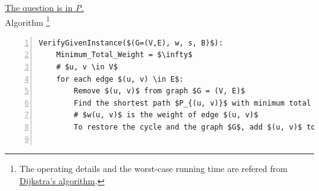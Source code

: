 \documentclass[10pt]{article}
\begin{document}
\begin{itemize}
\begin{mdframed}
        \underline{The question is in \textit{P.}}\\
        Algorithm \footnote {The operating details and the worst-case running time are refered from \href{https://en.wikipedia.org/wiki/Dijkstra\%27s_algorithm}{Dijkstra's algorithm}.}
        \begin{lstlisting}[mathescape=true, numbers=left]
VerifyGivenInstance($(G=(V,E), w, s, B)$):
    Minimum_Total_Weight = $\infty$
    # $u, v \in V$
    for each edge $(u, v) \in E$:
        Remove $(u, v)$ from graph $G = (V, E)$
        Find the shortest path $P_{(u, v)}$ with minimum total weight $W_{(u, v)}$ between $u, v$ by the Dijkstra’s shortest path algorithm
        # $w(u, v)$ is the weight of edge $(u, v)$
        To restore the cycle and the graph $G$, add $(u, v)$ to $P_{(u, v)}$ and $W_{(u, v)} = w(u, v) + W_{(u, v)}$


\end{lstlisting}
\end{mdframed}
\end{itemize}
\end{document}
